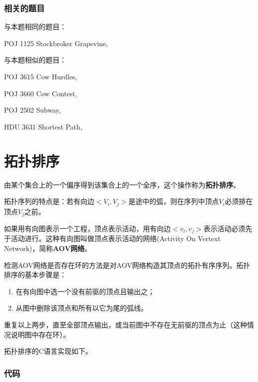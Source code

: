 \subsubsection{相关的题目}
与本题相同的题目：
\begindot
\item POJ 1125 Stockbroker Grapevine, 
\myenddot

与本题相似的题目：
\begindot
\item POJ 3615 Cow Hurdles, 
\item POJ 3660 Cow Contest, 
\item POJ 2502 Subway, 
\item HDU 3631 Shortest Path, 
\myenddot


\section{拓扑排序} %
由某个集合上的一个偏序得到该集合上的一个全序，这个操作称为\textbf{拓扑排序}。

拓扑序列的特点是：若有向边$<V_i, V_j>$是途中的弧，则在序列中顶点$V_i$必须排在顶点$V_j$之前。

如果用有向图表示一个工程，顶点表示活动，用有向边$<v_i,v_j>$表示活动必须先于活动进行。这种有向图叫做顶点表示活动的网络(Activity On Vertext Network)，简称\textbf{AOV网络}。

检测AOV网络是否存在环的方法是对AOV网络构造其顶点的拓扑有序序列。拓扑排序的基本步骤是：
\begin{enumerate}
\item 在有向图中选一个没有前驱的顶点且输出之；
\item 从图中删除该顶点和所有以它为尾的弧线。
\end{enumerate}
重复以上两步，直至全部顶点输出，或当前图中不存在无前驱的顶点为止（这种情况说明图中存在环）。

拓扑排序的C语言实现如下。

\subsubsection{代码}

